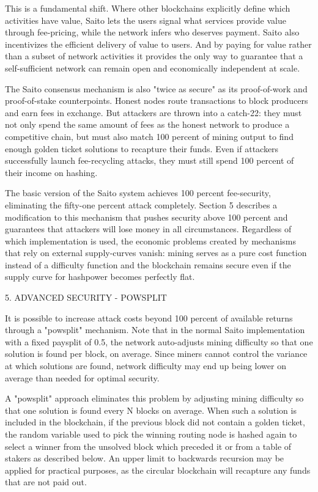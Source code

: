 \documentclass[11pt, oneside]{article}   	%
\begin{document}
\begin{multicols}{2}
This is a fundamental shift. Where other blockchains explicitly define which activities have value, Saito lets the users signal what services provide value through fee-pricing, while the network infers who deserves payment. Saito also incentivizes the efficient delivery of value to users. And by paying for value rather than a subset of network activities it provides the only way to guarantee that a self-sufficient network can remain open and economically independent at scale.

The Saito consensus mechanism is also "twice as secure" as its proof-of-work and proof-of-stake counterpoints. Honest nodes route transactions to block producers and earn fees in exchange. But attackers are thrown into a catch-22: they must not only spend the same amount of fees as the honest network to produce a competitive chain, but must also match 100 percent of mining output to find enough golden ticket solutions to recapture their funds.  Even if attackers successfully launch fee-recycling attacks, they must still spend 100 percent of their income on hashing.

The basic version of the Saito system achieves 100 percent fee-security, eliminating the fifty-one percent attack completely. Section 5 describes a modification to this mechanism that pushes security above 100 percent and guarantees that attackers will lose money in all circumstances. Regardless of which implementation is used, the economic problems created by mechanisms that rely on external supply-curves vanish: mining serves as a pure cost function instead of a difficulty function and the blockchain remains secure even if the supply curve for hashpower becomes perfectly flat.


5. ADVANCED SECURITY - POWSPLIT

It is possible to increase attack costs beyond 100 percent of available returns through a "powsplit" mechanism. Note that in the normal Saito implementation with a fixed paysplit of 0.5, the network auto-adjusts mining difficulty so that one solution is found per block, on average. Since miners cannot control the variance at which solutions are found, network difficulty may end up being lower on average than needed for optimal security.

A "powsplit" approach eliminates this problem by adjusting mining difficulty so that one solution is found every N blocks on average. When such a solution is included in the blockchain, if the previous block did not contain a golden ticket, the random variable used to pick the winning routing node is hashed again to select a winner from the unsolved block which preceded it or from a table of stakers as described below. An upper limit to backwards recursion may be applied for practical purposes, as the circular blockchain will recapture any funds that are not paid out.


\end{multicols}
\end{document}
